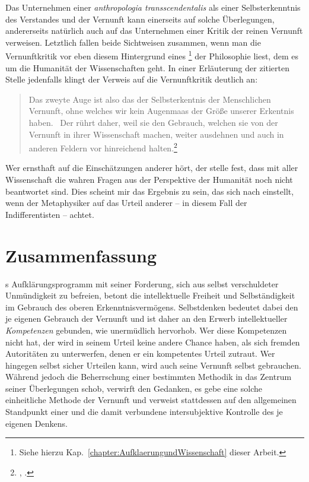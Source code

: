 Das Unternehmen einer \emph{anthropologia transscendentalis} als einer
Selbsterkenntnis des Verstandes und der Vernunft kann einerseits auf solche
Überlegungen, andererseits natürlich auch auf das Unternehmen einer Kritik der
reinen Vernunft verweisen. Letztlich fallen beide Sichtweisen zusammen, wenn man
die Vernunftkritik vor eben diesem Hintergrund eines
\footnote{Siehe hierzu
Kap.~\ref{chapter:AufklaerungundWissenschaft} dieser Arbeit.} der Philosophie
liest, dem es um die Humanität der Wissenschaften geht.
In einer Erläuterung der zitierten Stelle jedenfalls klingt der Verweis auf die
Vernunftkritik deutlich an:
\begin{quote}
 Das zweyte Auge ist also das der Selbsterkentnis der Menschlichen Vernunft,
 ohne welches wir kein Augenmaas der Größe unserer Erkentnis haben. \punkt\ Der
  rührt daher, weil sie den Gebrauch, welchen sie von der Vernunft
 in ihrer Wissenschaft machen, weiter ausdehnen und auch in anderen Feldern vor
 hinreichend halten.\footnote{\cite[][]{Kant:Reflexionen1900ff.},
 \cite[][XV: 395.17--19,24--27]{Kant:GesammelteWerke1900ff.}.}
\end{quote}
Wer ernsthaft auf die Einschätzungen anderer hört, der stelle fest, dass mit
aller Wissenschaft die wahren Fragen aus der Perspektive der Humanität noch
nicht beantwortet sind. Dies scheint mir das Ergebnis zu sein, das sich nach
 einstellt, wenn der Metaphysiker auf das Urteil anderer --
in diesem Fall der Indifferentisten -- achtet.

\section{Zusammenfassung}

s Aufklärungsprogramm mit seiner Forderung, sich aus
selbst verschuldeter Unmündigkeit zu befreien, betont die intellektuelle Freiheit
und Selbständigkeit im Gebrauch des oberen Erkenntnisvermögens. Selbstdenken
bedeutet dabei den je eigenen Gebrauch der Vernunft und ist daher an den Erwerb
intellektueller \emph{Kompetenzen} gebunden, wie
 unermüdlich
hervorhob. Wer diese Kompetenzen nicht hat, der wird in seinem Urteil keine
andere Chance haben, als sich fremden Autoritäten zu unterwerfen, denen er ein
kompetentes Urteil zutraut. Wer hingegen selbst sicher Urteilen kann, wird auch
seine Vernunft selbst gebrauchen. Während
 jedoch die
Beherrschung einer bestimmten Methodik in das Zentrum seiner Überlegungen schob,
verwirft  den Gedanken, es gebe eine solche einheitliche
Methode der Vernunft und verweist stattdessen auf den allgemeinen Standpunkt
einer  und die damit verbundene
intersubjektive Kontrolle des je eigenen Denkens.


